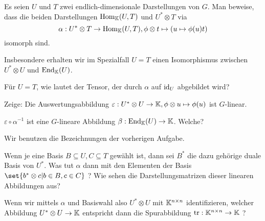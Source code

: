 \begin{sheet}
\begin{problem}[title={Isomorphismus zwischen Tensorprodukt und linearen Abbildungen}]\label{ex:hom_tensor_isomorphismus}
\begin{subproblem}
Es seien $U$ und $T$ zwei endlich-dimensionale Darstellungen von $G$. Man beweise, dass die beiden Darstellungen $\operatorname{Hom}_{\mathbb{K}}(U,T)$ und $U^\ast \otimes T$ via
\[\alpha: U^\ast \otimes T \to \operatorname{Hom}_{\mathbb{K}}(U,T), \phi \otimes t \mapsto (u\mapsto \phi(u)t)\]
isomorph sind.
\end{subproblem}

Insbesondere erhalten wir im Spezialfall $U=T$ einen Isomorphismus zwischen $U^\ast\otimes U$ und $\operatorname{End}_{\mathbb{K}}(U)$.

\begin{subproblem}
Für $U=T$, wie lautet der Tensor, der durch $\alpha$ auf $\operatorname{id}_U$ abgebildet wird?
\end{subproblem}

\begin{subproblem}
Zeige: Die Auswertungsabbildung $\varepsilon: U^\ast \otimes U \to \mathbb{K}, \phi\otimes u\mapsto \phi(u)$ ist $G$-linear.
\end{subproblem}

\begin{subproblem}
$\varepsilon\circ\alpha^{-1}$ ist eine $G$-lineare Abbildung $\beta: \operatorname{End}_{\mathbb{K}}(U) \to \mathbb{K}$. Welche?
\end{subproblem}

\end{problem}

\begin{problem}[title={\enquote{Matrizen als 2-Tensoren}}]\label{tensoren:ex:matrizen}
Wir benutzen die Bezeichnungen der vorherigen Aufgabe.
\begin{subproblem}
Wenn je eine Basis $B\subseteq U, C\subseteq T$ gewählt ist, dann sei $B^\ast$ die dazu gehörige duale Basis von $U^\ast$. Was tut $\alpha$ dann mit den Elementen der Basis $\set{b^\ast\otimes c | b\in B, c\in C}$ ? Wie sehen die Darstellungsmatrizen dieser linearen Abbildungen aus?
\end{subproblem}

\begin{subproblem}\label{tensoren:ex:matrizen:spur}
Wenn wir mittels $\alpha$ und Basiswahl also $U^\ast\otimes U$ mit $\mathbb{K}^{n\times n}$ identifizieren, welcher Abbildung $U^\ast \otimes U \to \mathbb{K}$ entspricht dann die Spurabbildung $\operatorname{tr}: \mathbb{K}^{n\times n}\to\mathbb{K}$ ?
\end{subproblem}
\end{problem}


\end{sheet}
